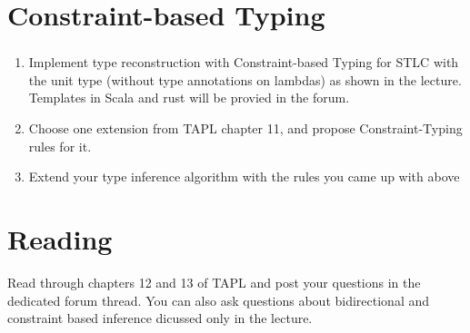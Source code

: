 \section{Constraint-based Typing}
\subsubsection{}

\begin{enumerate}
  \item Implement type reconstruction with Constraint-based Typing for STLC with the unit type 
    (without type annotations on lambdas) as shown in the lecture.
    Templates in Scala and rust will be provied in the forum.
  \item Choose one extension from TAPL chapter 11, and propose Constraint-Typing rules for it.
  \item Extend your type inference algorithm with the rules you came up with above
\end{enumerate}

\section{Reading}
Read through chapters 12 and 13 of TAPL and post your questions in the dedicated forum thread. 
You can also ask questions about bidirectional and constraint based inference dicussed only in the lecture.
